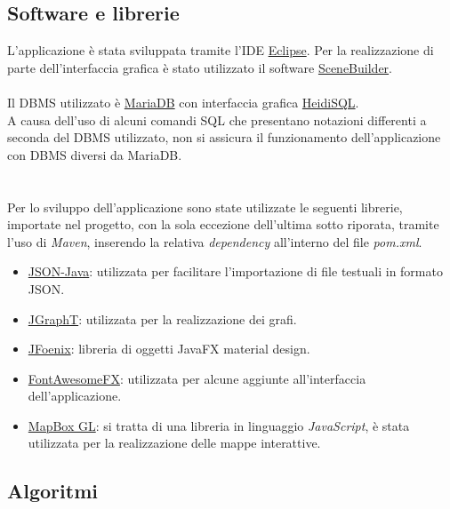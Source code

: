 \documentclass[a4paper, 12pt]{article}
\begin{document}
\newpage

	\subsection{Software e librerie}

	L'applicazione è stata sviluppata tramite l'IDE \href{https://www.eclipse.org/}{Eclipse}. Per la realizzazione di parte dell'interfaccia grafica è stato utilizzato il software \href{https://gluonhq.com/products/scene-builder/}{SceneBuilder}.\\\\
	Il DBMS utilizzato è \href{https://mariadb.org/}{MariaDB} con interfaccia grafica \href{https://www.heidisql.com/}{HeidiSQL}.\\
	A causa dell'uso di alcuni comandi SQL che presentano notazioni differenti a seconda del DBMS utilizzato, non si assicura il funzionamento dell'applicazione con DBMS diversi da MariaDB.\\\\\\
Per lo sviluppo dell'applicazione sono state utilizzate le seguenti librerie, importate nel progetto, con la sola eccezione dell'ultima sotto riporata, tramite l'uso di \textit{Maven}, inserendo la relativa \textit{dependency} all'interno del file \textit{pom.xml}.

	\begin{itemize}
		\item \href{https://github.com/stleary/JSON-java}{JSON-Java}: utilizzata per facilitare l'importazione di file testuali in formato JSON.
		\item \href{https://jgrapht.org/}{JGraphT}: utilizzata per la realizzazione dei grafi.
		\item \href{http://www.jfoenix.com/}{JFoenix}: libreria di oggetti JavaFX material design.
		\item \href{https://github.com/Jerady/fontawesomefx-glyphsbrowser}{FontAwesomeFX}: utilizzata per alcune aggiunte all'interfaccia dell'applicazione.
		\item \href{https://docs.mapbox.com/mapbox-gl-js/api/}{MapBox GL}: si tratta di una libreria in linguaggio \textit{JavaScript}, è stata utilizzata per la realizzazione delle mappe interattive.
	\end{itemize}

	

\newpage

	\subsection{Algoritmi}
\end{document}

